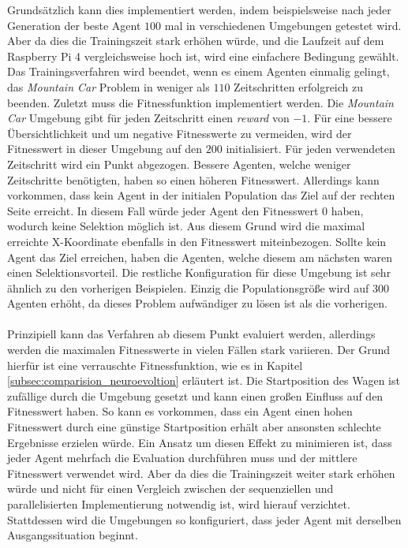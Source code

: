 Grundsätzlich kann dies implementiert werden, indem beispielsweise nach jeder Generation der beste Agent $100$ mal in verschiedenen Umgebungen getestet wird. Aber da dies die Trainingszeit stark erhöhen würde, und die Laufzeit auf dem Raspberry Pi 4 vergleichsweise hoch ist, wird eine einfachere Bedingung gewählt. Das Trainingsverfahren wird beendet, wenn es einem Agenten einmalig gelingt, das \emph{Mountain Car} Problem in weniger als $110$ Zeitschritten erfolgreich zu beenden. Zuletzt muss die Fitnessfunktion implementiert werden. Die \emph{Mountain Car} Umgebung gibt für jeden Zeitschritt einen \emph{reward} von $-1$. Für eine bessere Übersichtlichkeit und um negative Fitnesswerte zu vermeiden, wird der Fitnesswert in dieser Umgebung auf den $200$ initialisiert. Für jeden verwendeten Zeitschritt wird ein Punkt abgezogen. Bessere Agenten, welche weniger Zeitschritte benötigten, haben so einen höheren Fitnesswert. Allerdings kann vorkommen, dass kein Agent in der initialen Population das Ziel auf der rechten Seite erreicht. In diesem Fall würde jeder Agent den Fitnesswert $0$ haben, wodurch keine Selektion möglich ist. Aus diesem Grund wird die maximal erreichte X-Koordinate ebenfalls in den Fitnesswert miteinbezogen. Sollte kein Agent das Ziel erreichen, haben die Agenten, welche diesem am nächsten waren einen Selektionsvorteil. Die restliche Konfiguration für diese Umgebung ist sehr ähnlich zu den vorherigen Beispielen. Einzig die Populationsgröße wird auf $300$ Agenten erhöht, da dieses Problem aufwändiger zu lösen ist als die vorherigen.
\\\\
Prinzipiell kann das Verfahren ab diesem Punkt evaluiert werden, allerdings werden die maximalen Fitnesswerte in vielen Fällen stark variieren. Der Grund hierfür ist eine verrauschte Fitnessfunktion, wie es in Kapitel \ref{subsec:comparision_neuroevoltion} erläutert ist. Die Startposition des Wagen ist zufällige durch die Umgebung gesetzt und kann einen großen Einfluss auf den Fitnesswert haben. So kann es vorkommen, dass ein Agent einen hohen Fitnesswert durch eine günstige Startposition erhält aber ansonsten schlechte Ergebnisse erzielen würde. Ein Ansatz um diesen Effekt zu minimieren ist, dass jeder Agent mehrfach die Evaluation durchführen muss und der mittlere Fitnesswert verwendet wird. Aber da dies die Trainingszeit weiter stark erhöhen würde und nicht für einen Vergleich zwischen der sequenziellen und parallelisierten Implementierung notwendig ist, wird hierauf verzichtet. Stattdessen wird die Umgebungen so konfiguriert, dass jeder Agent mit derselben Ausgangssituation beginnt. 
